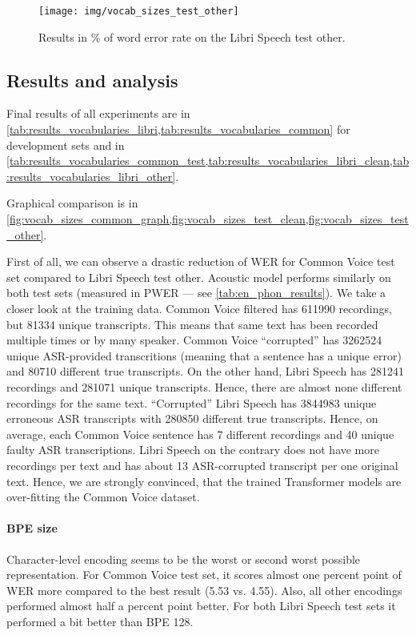 \begin{figure}[p]
	\centering
	\texttt{[image: img/vocab\_sizes\_test\_other]}
	\caption{Results in \% of word error rate on the Libri Speech test other.}
	\label{fig:vocab_sizes_test_other}
\end{figure}



\subsection{Results and analysis}

Final results of all experiments are in \cref{tab:results_vocabularies_libri,tab:results_vocabularies_common} for development sets and in \cref{tab:results_vocabularies_common_test,tab:results_vocabularies_libri_clean,tab:results_vocabularies_libri_other}.

Graphical comparison is in \cref{fig:vocab_sizes_common_graph,fig:vocab_sizes_test_clean,fig:vocab_sizes_test_other}.

First of all, we can observe a drastic reduction of WER for Common Voice test set compared to Libri Speech test other. Acoustic model performs similarly on both test sets (measured in PWER --- see \cref{tab:en_phon_results}). We take a closer look at the training data. Common Voice filtered has 611990 recordings, but 81334 unique transcripts. This means that same text has been recorded multiple times or by many speaker. Common Voice ``corrupted'' has 3262524 unique ASR-provided transcritions (meaning that a sentence has a unique error) and 80710 different true transcripts. On the other hand, Libri Speech has 281241 recordings and 281071 unique transcripts. Hence, there are almost none different recordings for the same text. ``Corrupted'' Libri Speech has 3844983 unique erroneous ASR transcripts with 280850 different true transcripts. Hence, on average, each Common Voice sentence has 7 different recordings and 40 unique faulty ASR transcriptions. Libri Speech on the contrary does not have more recordings per text and has about 13 ASR-corrupted transcript per one original text. Hence, we are strongly convinced, that the trained Transformer models are over-fitting the Common Voice dataset.

\paragraph{BPE size}
Character-level encoding seems to be the worst or second worst possible representation. For Common Voice test set, it scores almost one percent point of WER more compared to the best result (5.53 vs. 4.55). Also, all other encodings performed almost half a percent point better. For both Libri Speech test sets it performed a bit better than BPE 128. 

